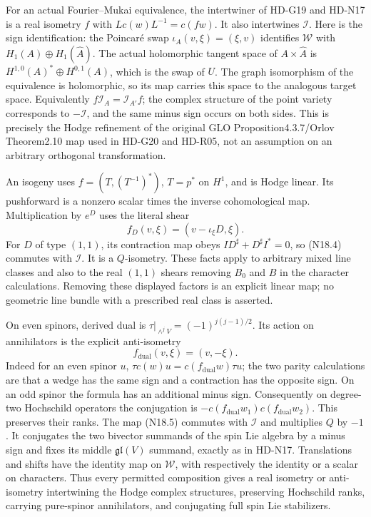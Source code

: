 For an actual Fourier--Mukai equivalence, the intertwiner of
HD-G19 and HD-N17 is a real isometry $f$ with
$Lc(w)L^{-1}=c(fw)$. It also intertwines $\mathcal I$.
Here is the sign identification: the Poincar\'e swap
$\iota_A(v,\xi)=(\xi,v)$ identifies $\mathcal W$ with
$H_1(A)\oplus H_1(\widehat A)$. The actual holomorphic tangent
space of $A\times\widehat A$ is
$H^{1,0}(A)^*\oplus H^{0,1}(A)$, which is the swap of $U$.
The graph isomorphism of the equivalence is holomorphic, so its
map carries this space to the analogous target space. Equivalently
$f\mathcal I_A=\mathcal I_{A'}f$; the complex structure of the
point variety corresponds to $-\mathcal I$, and the same minus
sign occurs on both sides. This is precisely the Hodge refinement
of the original GLO Proposition4.3.7/Orlov Theorem2.10 map used
in HD-G20 and HD-R05, not an assumption on an arbitrary
orthogonal transformation.

An isogeny uses $f=(T,(T^{-1})^*)$, $T=p^*$ on $H^1$,
and is Hodge linear. Its pushforward is a nonzero scalar times
the inverse cohomological map. Multiplication by $e^D$ uses
the literal shear
\begin{equation}
       f_D(v,\xi)=(v-\iota_\xi D,\xi).               \tag{N18.4}
\end{equation}
For $D$ of type $(1,1)$, its contraction map obeys
$ID^\sharp+D^\sharp I^*=0$, so (N18.4) commutes with
$\mathcal I$. It is a $Q$-isometry. These facts apply to
arbitrary mixed line classes and also to the real $(1,1)$
shears removing $B_0$ and $B$ in the character calculations.
Removing these displayed factors is an explicit linear map;
no geometric line bundle with a prescribed real class is asserted.

On even spinors, derived dual is
$\tau|_{\wedge^j V}=(-1)^{j(j-1)/2}$. Its action on
annihilators is the explicit anti-isometry
\begin{equation}
          f_{\mathrm{dual}}(v,\xi)=(v,-\xi).          \tag{N18.5}
\end{equation}
Indeed for an even spinor $u$,
$\tau c(w)u=c(f_{\mathrm{dual}}w)\tau u$;
the two parity calculations are that a wedge has the same sign
and a contraction has the opposite sign. On an odd spinor the
formula has an additional minus sign. Consequently on degree-two
Hochschild operators the conjugation is
$-c(f_{\mathrm{dual}}w_1)c(f_{\mathrm{dual}}w_2)$.
This preserves their ranks. The map (N18.5) commutes with
$\mathcal I$ and multiplies $Q$ by $-1$. It conjugates the
two bivector summands of the spin Lie algebra by a minus sign
and fixes its middle $\mathfrak{gl}(V)$ summand, exactly as
in HD-N17. Translations and shifts have the identity map on
$\mathcal W$, with respectively the identity or a scalar on
characters. Thus every permitted composition gives a real
isometry or anti-isometry intertwining the Hodge complex
structures, preserving Hochschild ranks, carrying pure-spinor
annihilators, and conjugating full spin Lie stabilizers.

